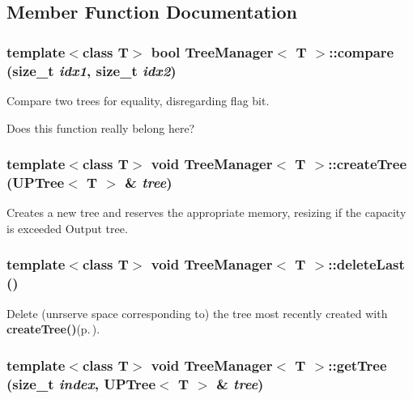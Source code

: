 \subsection{Member Function Documentation}
\subsubsection{\setlength{\rightskip}{0pt plus 5cm}template$<$class T$>$ bool {\bf Tree\-Manager}$<$ T $>$::compare (size\_\-t {\em idx1}, size\_\-t {\em idx2})}\label{classTreeManager_a11}


Compare two trees for equality, disregarding flag bit. 

Does this function really belong here? 
\subsubsection{\setlength{\rightskip}{0pt plus 5cm}template$<$class T$>$ void {\bf Tree\-Manager}$<$ T $>$::create\-Tree ({\bf UPTree}$<$ T $>$ \& {\em tree})}\label{classTreeManager_a8}


Creates a new tree and reserves the appropriate memory, resizing if the capacity is exceeded  Output tree. 

\subsubsection{\setlength{\rightskip}{0pt plus 5cm}template$<$class T$>$ void {\bf Tree\-Manager}$<$ T $>$::delete\-Last ()\hspace{0.3cm}{\tt  [inline]}}\label{classTreeManager_a10}


Delete (unrserve space corresponding to) the tree most recently created with {\bf create\-Tree()}{\rm (p.\,\pageref{classTreeManager_a8})}. 

\subsubsection{\setlength{\rightskip}{0pt plus 5cm}template$<$class T$>$ void {\bf Tree\-Manager}$<$ T $>$::get\-Tree (size\_\-t {\em index}, {\bf UPTree}$<$ T $>$ \& {\em tree})\hspace{0.3cm}{\tt  [inline]}}\label{classTreeManager_a9}


